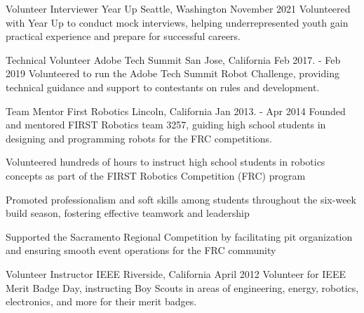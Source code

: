 

\begin{cventries}

  \cventry
    {Volunteer Interviewer} %
    {Year Up} %
    {Seattle, Washington} %
    {November 2021} %
    {Volunteered with Year Up to conduct mock interviews, helping underrepresented youth gain practical experience and prepare for successful careers.} %
    {}

  \cventry
    {Technical Volunteer} %
    {Adobe Tech Summit} %
    {San Jose, California} %
    {Feb 2017. - Feb 2019} %
    {Volunteered to run the Adobe Tech Summit Robot Challenge, providing technical guidance and support to contestants on rules and development.} %
    {}

  \cventry
    {Team Mentor} %
    {First Robotics} %
    {Lincoln, California} %
    {Jan 2013. - Apr 2014} %
    {Founded and mentored FIRST Robotics team 3257, guiding high school students in designing and programming robots for the FRC competitions.} %
    {
        \begin{cvitems} %
            \item {Volunteered hundreds of hours to instruct high school students in robotics concepts as part of the FIRST Robotics Competition (FRC) program}
            \item {Promoted professionalism and soft skills among students throughout the six-week build season, fostering effective teamwork and leadership}
            \item {Supported the Sacramento Regional Competition by facilitating pit organization and ensuring smooth event operations for the FRC community}
        \end{cvitems}
    }

  \cventry
    {Volunteer Instructor} %
    {IEEE} %
    {Riverside, California} %
    {April 2012} %
    {Volunteer for IEEE Merit Badge Day, instructing Boy Scouts in areas of engineering, energy, robotics, electronics, and more for their merit badges.} %
    {}

\end{cventries}
